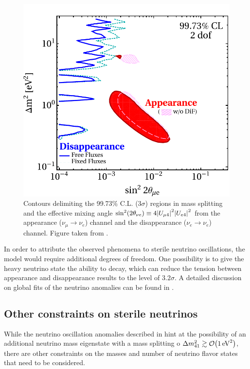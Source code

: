 \begin{figure}
    \centering
    \includegraphics[width=0.7\linewidth]{figures/theory/app-disapp.pdf}
    \caption{Contours delimiting the 99.73\% C.L. ($3\sigma$) regions in mass splitting and the effective mixing angle $\sin^2(2\theta_{\nu e})\equiv 4\abs{U_{\mu 4}}^2\abs{U_{e4}}^2$ from the appearance ($\nu_\mu \rightarrow \nu_e$) channel and the disappearance ($\nu_e \rightarrow \nu_e$) channel. Figure taken from \cite{Dentler_2018}.\label{fig:app-disapp-tension}}
\end{figure}
In order to attribute the observed phenomena to sterile neutrino oscillations, the model would require additional degrees of freedom. One possibility is to give the heavy neutrino state the ability to decay, which can reduce the tension between appearance and disappearance results to the level of $3.2\sigma$\cite{Diaz_2020}. A detailed discussion on global fits of the neutrino anomalies can be found in .

\subsection{Other constraints on sterile neutrinos}
While the neutrino oscillation anomalies described in  hint at the possibility of an additional neutrino mass eigenstate with a mass splitting o $\Delta m^2_{41} \gtrsim \order{\SI{1}{eV^2}}$, there are other constraints on the masses and number of neutrino flavor states that need to be considered.

